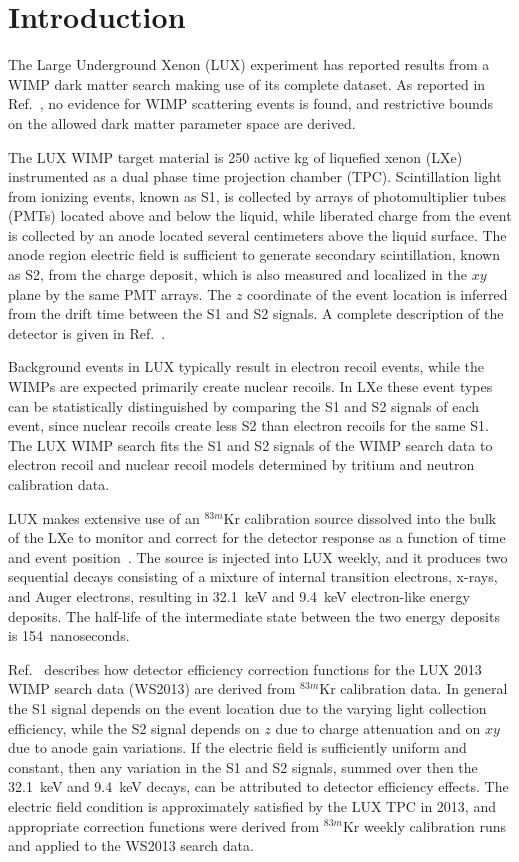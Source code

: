 \section{Introduction}\label{section:Intro}

The Large Underground Xenon (LUX) experiment has reported results from a WIMP dark matter 
search making use of its complete dataset. As reported in Ref.~\cite{Run4Paper}, no 
evidence for WIMP scattering events is found, and restrictive bounds on the allowed dark 
matter parameter space are derived.

The LUX WIMP target material is 250 active kg of liquefied xenon (LXe) 
instrumented as a dual phase time 
projection chamber (TPC). Scintillation light from ionizing events, known
as S1, is collected by arrays of photomultiplier tubes (PMTs) located above and below the liquid, 
while liberated charge from the event is collected by an anode located several centimeters above the liquid
surface. The anode region electric field is sufficient to generate secondary scintillation, known
as S2, from the charge deposit, which is also measured and localized in the $xy$ plane by the 
same PMT arrays. The $z$ coordinate of the event location is inferred
from the drift time between the S1 and S2 signals. A complete description of the detector is given in Ref.~\cite{nimpaper}. 

Background events in LUX typically result in electron recoil events, while the WIMPs are
expected primarily create nuclear recoils. In LXe these event types can be statistically distinguished by 
comparing the S1 and S2 signals of each event, since nuclear recoils create less
S2 than electron recoils for the same S1. The LUX WIMP search fits the S1 and S2 signals
of the WIMP search data to electron recoil and nuclear recoil models determined by tritium and neutron
calibration data.

LUX makes extensive use of an $^{83m}$Kr 
calibration source dissolved into the bulk of the LXe 
to monitor and correct for the detector response as a function of time and event position~\cite{scottspaper}.
The source is injected into LUX weekly, and it 
produces two sequential decays consisting of a mixture of internal transition electrons, x-rays, 
and Auger electrons, resulting in 32.1~keV and 9.4~keV electron-like energy deposits. 
The half-life of the 
intermediate state between the two energy deposits is 154~nanoseconds. 

Ref.~\cite{scottspaper}
describes how detector efficiency correction functions for the LUX 2013 WIMP search data (WS2013) are
derived from  $^{83m}$Kr calibration data. In general
the S1 signal depends on the event location due to the varying light collection efficiency, 
while the S2 signal depends on $z$ due to charge attenuation and on $xy$ due to 
anode gain variations. If the electric field is sufficiently uniform and constant, then any
variation in the S1 and S2 signals, summed over 
then the 32.1~keV and 9.4~keV decays, can be attributed to detector efficiency effects. The
electric field condition is approximately satisfied by the LUX TPC in 2013, and appropriate 
correction functions were derived from $^{83m}$Kr weekly calibration runs and applied to the 
WS2013 search data.


